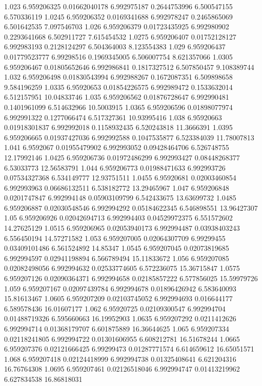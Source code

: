 {1.023 6.959206325 0.01662040178 6.992975187 0.2644753996 6.500547155 6.570336119
1.0245 6.959206352 0.0169341688 6.992978247 0.2465865069 6.501642535 7.097546703
1.026 6.959206379 0.01723435925 6.992980902 0.2293641668 6.502911727 7.615454532
1.0275 6.959206407 0.01752128127 6.992983193 0.2128124297 6.504364003 8.123554383
1.029 6.959206437 0.01779523777 6.99298516 0.1969345005 6.506007754 8.621357066
1.0305 6.959206467 0.01805652646 6.992986841 0.1817327512 6.507850457 9.108389744
1.032 6.959206498 0.01830543994 6.992988267 0.1672087351 6.509898658 9.584196259
1.0335 6.95920653 0.01854226575 6.992989472 0.1533632014 6.512157951 10.04833746
1.035 6.959206562 0.01876728647 6.992990481 0.1401961099 6.514632966 10.5003915
1.0365 6.959206596 0.01898077974 6.992991322 0.1277066474 6.517327361 10.93995416
1.038 6.95920663 0.01918301837 6.992992018 0.1158932435 6.520243818 11.3666391
1.0395 6.959206665 0.01937427036 6.992992588 0.1047535877 6.523384039 11.78007813
1.041 6.9592067 0.01955479902 6.992993052 0.09428464706 6.526748755 12.17992146
1.0425 6.959206736 0.01972486299 6.992993427 0.08448268377 6.53033773 12.56583791
1.044 6.959206773 0.01988471633 6.992993726 0.07534327368 6.534149777 12.93751511
1.0455 6.95920681 0.02003460854 6.992993963 0.06686132511 6.538182772 13.29465967
1.047 6.959206848 0.0201747847 6.992994148 0.05903109799 6.542433675 13.63699732
1.0485 6.959206887 0.02030548546 6.992994292 0.05184622345 6.546898551 13.96427307
1.05 6.959206926 0.02042694713 6.992994403 0.04529972375 6.551572602 14.27625129
1.0515 6.959206965 0.02053940173 6.992994487 0.03938403243 6.556450194 14.57271582
1.053 6.959207005 0.02064307709 6.99299455 0.03409101486 6.561524892 14.85347
1.0545 6.959207045 0.02073819685 6.992994597 0.02941198894 6.566789494 15.11833672
1.056 6.959207085 0.02082498056 6.992994632 0.02533774605 6.572236075 15.36715847
1.0575 6.959207126 0.02090364371 6.992994658 0.02185857222 6.577856025 15.59979726
1.059 6.959207167 0.02097439784 6.992994678 0.01896426942 6.583640093 15.81613467
1.0605 6.959207209 0.02103745052 6.992994693 0.016644177 6.589578436 16.01607177
1.062 6.95920725 0.02109300547 6.992994704 0.01488719326 6.595660663 16.19952903
1.0635 6.959207292 0.0211412626 6.992994714 0.01368179707 6.601875889 16.36644625
1.065 6.959207334 0.02118241805 6.992994722 0.01301606955 6.608212781 16.51678244
1.0665 6.959207376 0.02121666425 6.99299473 0.01287771574 6.614659612 16.65051571
1.068 6.959207418 0.02124418999 6.992994738 0.01325408641 6.621204316 16.76764308
1.0695 6.959207461 0.02126518046 6.992994747 0.01413219962 6.627834538 16.86818031
}
